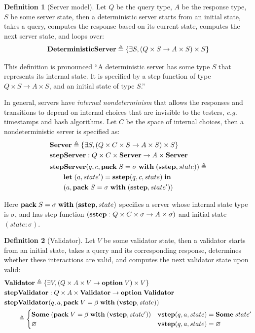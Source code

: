 \documentclass{article}
\theoremstyle{definition}
\newtheorem{definition}{Definition}
\newcommand{\Let}{\ottkw{let}\;}
\newcommand{\In}{\;\ottkw{in}}
\newcommand{\letin}[2]{\Let#1=#2\In}
\newcommand{\sigT}[2]{\{\exists#1,#2\}}
\newcommand{\existT}[3]{\ottkw{pack}\;#1=#2\;\ottkw{with}\;#3}
\newcommand{\Server}{\ottkw{Server}}
\newcommand{\Validator}{\ottkw{Validator}}
\newcommand{\stepServer}{\ottkw{stepServer}}
\newcommand{\stepValidator}{\ottkw{stepValidator}}
\newcommand{\sstep}{\ottkw{sstep}}
\newcommand{\vstep}{\ottkw{vstep}}
\newcommand{\option}{\ottkw{option}\;}
\newcommand{\Some}[1]{\ottkw{Some}\;#1}
\newcommand{\None}{\varnothing}
\begin{document}
\begin{definition}[Server model]
Let $Q$ be the query type, $A$ be the response type, $S$ be some server state,
then a deterministic server starts from an initial state, takes a query,
computes the response based on its current state, computes the next server
state, and loops over:
\[ \ottkw{DeterministicServer}\triangleq\sigT{S}{(Q \times S \to A \times S) \times S} \]

This definition is pronounced ``A deterministic server has some type $S$ that
represents its internal state.  It is specified by a step function of type
$Q\times S\to A\times S$, and an initial state of type $S$.''

In general, servers have {\em internal nondeterminism} that allows the responses
and transitions to depend on internal choices that are invisible to the testers,
{\it e.g.} timestamps and hash algorithms.  Let $C$ be the space of internal
choices, then a nondeterministic server is specified as:
\begin{align*}
  &\Server\triangleq\sigT{S}{(Q \times C \times S \to A \times S) \times S} \\
  &\stepServer:Q\times C \times \Server \to A\times \Server \\
  &\stepServer(q,c,\existT{S}{\sigma}{(\sstep, state)})\triangleq\\
  &\qquad\letin{(a,state')}{\sstep(q,c,state)} \\
  &\qquad(a, \existT{S}{\sigma}{(\sstep, state')})
\end{align*}
\end{definition}

Here $\existT{S}{\sigma}{(\sstep, state)}$ specifies a server whose internal
state type is $\sigma$, and has step function $(\sstep:Q\times C \times \sigma
\to A \times \sigma)$ and initial state $(state: \sigma)$.

\begin{definition}[Validator]
Let $V$ be some validator state, then a validator starts from an initial state,
takes a query and its corresponding response, determines whether these
interactions are valid, and computes the next validator state upon valid:
\begin{align*}
  &\Validator\triangleq\sigT{V}{(Q \times A \times V \to \option V) \times V} \\
  &\stepValidator:Q\times A \times \Validator \to \option \Validator \\
  &\stepValidator(q,a,\existT{V}{\beta}{(\vstep, state)})\\
  &\qquad\triangleq\begin{cases}
  \Some{(\existT{V}{\beta}{(\vstep,state')})} & \vstep(q,a,state)=\Some{state'} \\
  \None & \vstep(q,a,state)=\None
  \end{cases}
\end{align*}
\end{definition}
\end{document}

